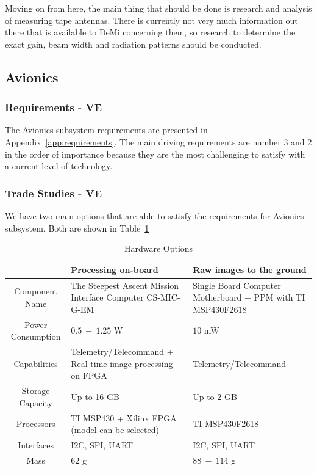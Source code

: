 \documentclass[12pt]{article}
\begin{document}
Moving on from here, the main thing that should be done is research and analysis of measuring tape antennas. There is currently not very much information out there that is available to DeMi concerning them, so research to determine the exact gain, beam width and radiation patterns should be conducted.		
		

		\subsection{Avionics}
			\subsubsection{Requirements - VE}
The Avionics subsystem requirements are presented in Appendix~\ref{app:requirements}.  The main driving requirements are number 3 and 2 in the order of importance because they are the most challenging to satisfy with a current level of technology.

			\subsubsection{Trade Studies - VE}
We have two main options that are able to satisfy the requirements for Avionics subsystem. Both are shown in Table~\ref{table:avionics_hardware_options}

\begin{table}[ht]
\caption{Hardware Options}
\label{table:avionics_hardware_options}
\begin{center}
    \begin{tabular}{| c || p{6cm} | p{6cm} |} \hline
     &	Processing on-board & Raw images to the ground \\ \hline \hline
    Component Name & The Steepest Ascent Mission Interface Computer CS-MIC-G-EM & Single Board Computer Motherboard + PPM with TI MSP430F2618 \\ \hline
    Power Consumption & $0.5\ -\ 1.25$ W & $10$ mW \\ \hline
    Capabilities & Telemetry/Telecommand + Real time image processing on FPGA & Telemetry/Telecommand\\ \hline
    Storage Capacity & Up to 16 GB & Up to 2 GB \\ \hline
    Processors & TI MSP430  + Xilinx FPGA (model can be selected) & TI MSP430F2618 \\ \hline
    Interfaces & I2C, SPI, UART & I2C, SPI, UART \\ \hline
    Mass & $62$ g & $88\ -\ 114$ g \\ \hline 
    \end{tabular}
\end{center}
\end{table}
\end{document}
